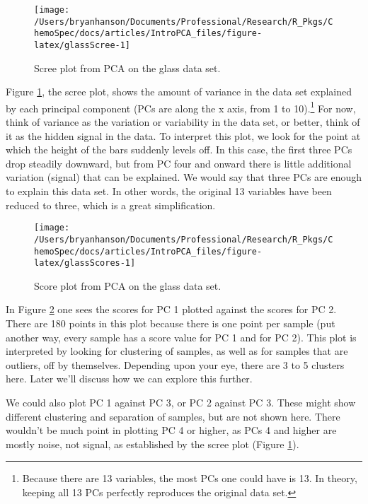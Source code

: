 \documentclass[10pt,twocolumn,twoside,]{pinp}
\begin{document}
\begin{figure}

{\centering \texttt{[image: /Users/bryanhanson/Documents/Professional/Research/R\_Pkgs/ChemoSpec/docs/articles/IntroPCA\_files/figure-latex/glassScree-1]} 

}

\caption{Scree plot from PCA on the glass data set.\label{fig:glassScree}}\label{fig:glassScree}
\end{figure}

Figure \ref{fig:glassScree}, the scree plot, shows the amount of
variance in the data set explained by each principal component (PCs are
along the x axis, from 1 to
10).\footnote{Because there are 13 variables, the most PCs one could have is 13.  In theory, keeping all 13 PCs perfectly reproduces the original data set.}
For now, think of variance as the variation or variability in the data
set, or better, think of it as the hidden signal in the data. To
interpret this plot, we look for the point at which the height of the
bars suddenly levels off. In this case, the first three PCs drop
steadily downward, but from PC four and onward there is little
additional variation (signal) that can be explained. We would say that
three PCs are enough to explain this data set. In other words, the
original 13 variables have been reduced to three, which is a great
simplification.

\begin{figure}

{\centering \texttt{[image: /Users/bryanhanson/Documents/Professional/Research/R\_Pkgs/ChemoSpec/docs/articles/IntroPCA\_files/figure-latex/glassScores-1]} 

}

\caption{Score plot from PCA on the glass data set.\label{fig:glassScores}}\label{fig:glassScores}
\end{figure}

In Figure \ref{fig:glassScores} one sees the scores for PC 1 plotted
against the scores for PC 2. There are 180 points in this plot because
there is one point per sample (put another way, every sample has a score
value for PC 1 and for PC 2). This plot is interpreted by looking for
clustering of samples, as well as for samples that are outliers, off by
themselves. Depending upon your eye, there are 3 to 5 clusters here.
Later we'll discuss how we can explore this further.

We could also plot PC 1 against PC 3, or PC 2 against PC 3. These might
show different clustering and separation of samples, but are not shown
here. There wouldn't be much point in plotting PC 4 or higher, as PCs 4
and higher are mostly noise, not signal, as established by the scree
plot (Figure \ref{fig:glassScree}).
\end{document}
